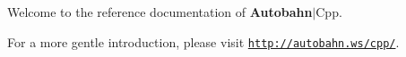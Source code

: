 Welcome to the reference documentation of {\bfseries Autobahn}$\vert$\+Cpp.~\newline


For a more gentle introduction, please visit \href{http://autobahn.ws/cpp/}{\tt http\+://autobahn.\+ws/cpp/}. 